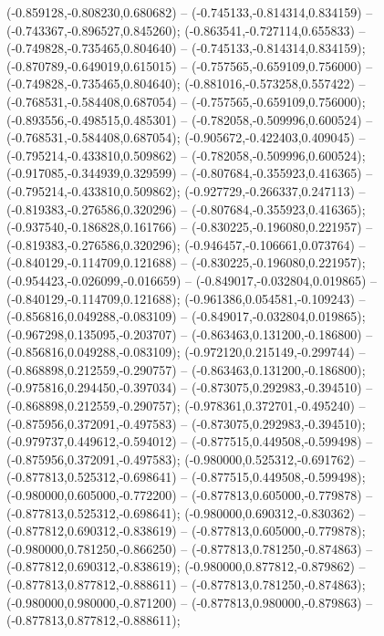  (-0.859128,-0.808230,0.680682) -- (-0.745133,-0.814314,0.834159) -- (-0.743367,-0.896527,0.845260);
 (-0.863541,-0.727114,0.655833) -- (-0.749828,-0.735465,0.804640) -- (-0.745133,-0.814314,0.834159);
 (-0.870789,-0.649019,0.615015) -- (-0.757565,-0.659109,0.756000) -- (-0.749828,-0.735465,0.804640);
 (-0.881016,-0.573258,0.557422) -- (-0.768531,-0.584408,0.687054) -- (-0.757565,-0.659109,0.756000);
 (-0.893556,-0.498515,0.485301) -- (-0.782058,-0.509996,0.600524) -- (-0.768531,-0.584408,0.687054);
 (-0.905672,-0.422403,0.409045) -- (-0.795214,-0.433810,0.509862) -- (-0.782058,-0.509996,0.600524);
 (-0.917085,-0.344939,0.329599) -- (-0.807684,-0.355923,0.416365) -- (-0.795214,-0.433810,0.509862);
 (-0.927729,-0.266337,0.247113) -- (-0.819383,-0.276586,0.320296) -- (-0.807684,-0.355923,0.416365);
 (-0.937540,-0.186828,0.161766) -- (-0.830225,-0.196080,0.221957) -- (-0.819383,-0.276586,0.320296);
 (-0.946457,-0.106661,0.073764) -- (-0.840129,-0.114709,0.121688) -- (-0.830225,-0.196080,0.221957);
 (-0.954423,-0.026099,-0.016659) -- (-0.849017,-0.032804,0.019865) -- (-0.840129,-0.114709,0.121688);
 (-0.961386,0.054581,-0.109243) -- (-0.856816,0.049288,-0.083109) -- (-0.849017,-0.032804,0.019865);
 (-0.967298,0.135095,-0.203707) -- (-0.863463,0.131200,-0.186800) -- (-0.856816,0.049288,-0.083109);
 (-0.972120,0.215149,-0.299744) -- (-0.868898,0.212559,-0.290757) -- (-0.863463,0.131200,-0.186800);
 (-0.975816,0.294450,-0.397034) -- (-0.873075,0.292983,-0.394510) -- (-0.868898,0.212559,-0.290757);
 (-0.978361,0.372701,-0.495240) -- (-0.875956,0.372091,-0.497583) -- (-0.873075,0.292983,-0.394510);
 (-0.979737,0.449612,-0.594012) -- (-0.877515,0.449508,-0.599498) -- (-0.875956,0.372091,-0.497583);
 (-0.980000,0.525312,-0.691762) -- (-0.877813,0.525312,-0.698641) -- (-0.877515,0.449508,-0.599498);
 (-0.980000,0.605000,-0.772200) -- (-0.877813,0.605000,-0.779878) -- (-0.877813,0.525312,-0.698641);
 (-0.980000,0.690312,-0.830362) -- (-0.877812,0.690312,-0.838619) -- (-0.877813,0.605000,-0.779878);
 (-0.980000,0.781250,-0.866250) -- (-0.877813,0.781250,-0.874863) -- (-0.877812,0.690312,-0.838619);
 (-0.980000,0.877812,-0.879862) -- (-0.877813,0.877812,-0.888611) -- (-0.877813,0.781250,-0.874863);
 (-0.980000,0.980000,-0.871200) -- (-0.877813,0.980000,-0.879863) -- (-0.877813,0.877812,-0.888611);
